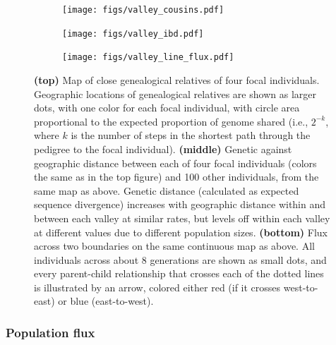 \documentclass{ar-1col}
\begin{document}
\begin{figure}[H]
    \centering
    \begin{subfigure}{0.49\linewidth}
        \centering
        \texttt{[image: figs/valley\_cousins.pdf]}
        \label{cousin_map}
    \end{subfigure}
    \begin{subfigure}{0.49\linewidth}
        \centering
        \texttt{[image: figs/valley\_ibd.pdf]}
        \label{ibd}
    \end{subfigure}
    \begin{subfigure}{\textwidth}
        \centering
        \texttt{[image: figs/valley\_line\_flux.pdf]}
        \label{valleyflux}
    \end{subfigure}
        \caption{
            \textbf{(top)} Map of close genealogical relatives of four focal individuals.
            Geographic locations of 
            genealogical relatives are shown as larger dots, with one color for each focal individual,
            with circle area proportional to the expected proportion of genome shared
            (i.e., $2^{-k}$, where $k$ is the number of steps in the shortest path through the pedigree to the focal individual).
            \textbf{(middle)}
            Genetic against geographic distance between each of four focal individuals
            (colors the same as in the top figure)
            and 100 other individuals, from the same map as above.
            Genetic distance (calculated as expected sequence divergence)
            increases with geographic distance within and between each valley at similar rates,
            but levels off within each valley at different values
            due to different population sizes.
            \textbf{(bottom)}
            Flux across two boundaries on the same continuous map as above.
            All individuals across about 8 generations are shown as small dots,
            and every parent-child relationship that crosses each of the dotted lines
            is illustrated by an arrow, colored either red (if it crosses west-to-east) or blue (east-to-west).
        }
        \label{fig:dispersal}
\end{figure}

\subsubsection{Population flux}
\end{document}
